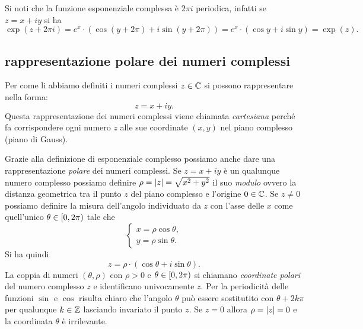 Si noti che la funzione esponenziale complessa è $2\pi i$ periodica, infatti 
se $z=x+iy$ si ha 
\[
\exp(z+2\pi i) 
= e^x\cdot (\cos(y+2\pi) + i\sin(y+2\pi)) 
= e^x\cdot (\cos y + i \sin y) 
= \exp(z).
\]


\subsection{rappresentazione polare dei numeri complessi}

Per come li abbiamo definiti i numeri complessi $z\in {\mathbb C}$ si possono 
rappresentare nella forma:
\[
  z = x + i y.
\]
Questa rappresentazione dei numeri complessi viene chiamata \emph{cartesiana}
perché fa corrispondere ogni numero $z$ alle sue coordinate $(x,y)$ nel
piano complesso (piano di Gauss). 

Grazie alla definizione di esponenziale complesso possiamo anche 
dare una rappresentazione \emph{polare} dei numeri complessi.
Se $z=x+iy$ è un qualunque numero complesso possiamo definire 
$\rho = {\left|z\right|} = \sqrt{x^2+y^2}$ il suo \emph{modulo} 
ovvero la distanza geometrica tra il punto $z$ del piano complesso 
e l'origine $0\in {\mathbb C}$.
Se $z\neq 0$ possiamo definire la misura dell'angolo individuato 
da $z$ con l'asse delle $x$ come quell'unico 
$\theta \in \left[0,2\pi\right)$ tale che
\[
  \begin{cases}
    x = \rho \cos \theta,\\
    y = \rho \sin \theta.
  \end{cases}
\]
Si ha quindi 
\[
  z = \rho \cdot (\cos \theta + i \sin \theta). 
\]
La coppia di numeri $(\theta,\rho)$ con $\rho>0$ e $\theta\in\left[0,2\pi\right)$ 
si chiamano \emph{coordinate polari} del numero complesso $z$ 
e identificano univocamente $z$. 
Per la periodicità delle funzioni $\sin$ e $\cos$ risulta chiaro 
che l'angolo $\theta$ può essere sostitutito con $\theta +2k\pi$ 
per qualunque $k\in {\mathbb Z}$ lasciando invariato il punto $z$.
Se $z=0$ allora $\rho={\left|z\right|}=0$ e la coordinata $\theta$ è irrilevante.

